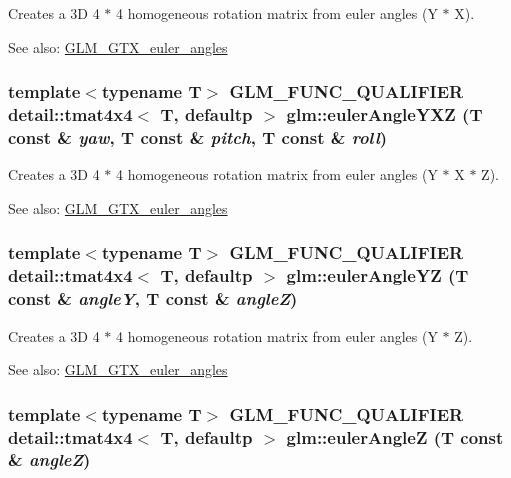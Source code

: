 Creates a 3D 4 $\ast$ 4 homogeneous rotation matrix from euler angles (Y $\ast$ X). \begin{Desc}
\item[See also:]\hyperlink{group__gtx__euler__angles}{GLM\_\-GTX\_\-euler\_\-angles} \end{Desc}
\hypertarget{group__gtx__euler__angles_g7ba74fb9419dd90256b682855e904159}{
\subsubsection[eulerAngleYXZ]{\setlength{\rightskip}{0pt plus 5cm}template$<$typename T$>$ GLM\_\-FUNC\_\-QUALIFIER detail::tmat4x4$<$ T, defaultp $>$ glm::eulerAngleYXZ (T const \& {\em yaw}, \/  T const \& {\em pitch}, \/  T const \& {\em roll})}}
\label{group__gtx__euler__angles_g7ba74fb9419dd90256b682855e904159}


Creates a 3D 4 $\ast$ 4 homogeneous rotation matrix from euler angles (Y $\ast$ X $\ast$ Z). \begin{Desc}
\item[See also:]\hyperlink{group__gtx__euler__angles}{GLM\_\-GTX\_\-euler\_\-angles} \end{Desc}
\hypertarget{group__gtx__euler__angles_g9ac024a16439421d2a3c7c17b6df31b5}{
\subsubsection[eulerAngleYZ]{\setlength{\rightskip}{0pt plus 5cm}template$<$typename T$>$ GLM\_\-FUNC\_\-QUALIFIER detail::tmat4x4$<$ T, defaultp $>$ glm::eulerAngleYZ (T const \& {\em angleY}, \/  T const \& {\em angleZ})}}
\label{group__gtx__euler__angles_g9ac024a16439421d2a3c7c17b6df31b5}


Creates a 3D 4 $\ast$ 4 homogeneous rotation matrix from euler angles (Y $\ast$ Z). \begin{Desc}
\item[See also:]\hyperlink{group__gtx__euler__angles}{GLM\_\-GTX\_\-euler\_\-angles} \end{Desc}
\hypertarget{group__gtx__euler__angles_ge77e2c08c118ecd34ffc8ca425d2cf77}{
\subsubsection[eulerAngleZ]{\setlength{\rightskip}{0pt plus 5cm}template$<$typename T$>$ GLM\_\-FUNC\_\-QUALIFIER detail::tmat4x4$<$ T, defaultp $>$ glm::eulerAngleZ (T const \& {\em angleZ})}}
\label{group__gtx__euler__angles_ge77e2c08c118ecd34ffc8ca425d2cf77}


